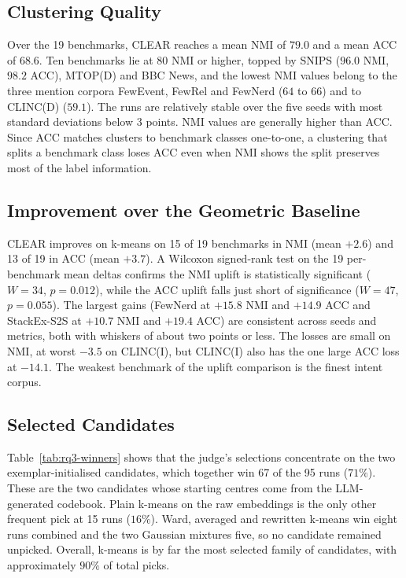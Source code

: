 \documentclass[11pt,a4paper,oneside]{report}
\begin{document}
\subsection{Clustering Quality}\label{sec:results-rq3-quality}

Over the 19 benchmarks, CLEAR reaches a mean NMI of $79.0$ and a mean ACC of $68.6$. Ten benchmarks lie at $80$ NMI or higher, topped by SNIPS ($96.0$ NMI, $98.2$ ACC), MTOP(D) and BBC News, and the lowest NMI values belong to the three mention corpora FewEvent, FewRel and FewNerd ($64$ to $66$) and to CLINC(D) ($59.1$). The runs are relatively stable over the five seeds with most standard deviations below $3$ points. NMI values are generally higher than ACC. Since ACC matches clusters to benchmark classes one-to-one, a clustering that splits a benchmark class loses ACC even when NMI shows the split preserves most of the label information.

\subsection{Improvement over the Geometric Baseline}

CLEAR improves on k-means on 15 of 19 benchmarks in NMI (mean $+2.6$) and 13 of 19 in ACC (mean $+3.7$). A Wilcoxon signed-rank test on the 19 per-benchmark mean deltas confirms the NMI uplift is statistically significant ($W = 34$, $p = 0.012$), while the ACC uplift falls just short of significance ($W = 47$, $p = 0.055$). The largest gains (FewNerd at $+15.8$ NMI and $+14.9$ ACC and StackEx-S2S at $+10.7$ NMI and $+19.4$ ACC) are consistent across seeds and metrics, both with whiskers of about two points or less. The losses are small on NMI, at worst $-3.5$ on CLINC(I), but CLINC(I) also has the one large ACC loss at $-14.1$. The weakest benchmark of the uplift comparison is the finest intent corpus.

\subsection{Selected Candidates}\label{sec:selected_candidates}

Table~\ref{tab:rq3-winners} shows that the judge's selections concentrate on the two exemplar-initialised candidates, which together win 67 of the 95 runs ($71\%$). These are the two candidates whose starting centres come from the LLM-generated codebook. Plain k-means on the raw embeddings is the only other frequent pick at 15 runs ($16\%$). Ward, averaged and rewritten k-means win eight runs combined and the two Gaussian mixtures five, so no candidate remained unpicked. Overall, k-means is by far the most selected family of candidates, with approximately $90\%$ of total picks.
\end{document}
